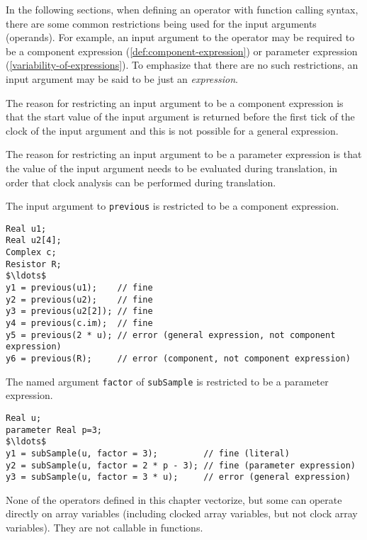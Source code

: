 In the following sections, when defining an operator with function calling syntax, there are some common restrictions being used for the input arguments (operands).
For example, an input argument to the operator may be required to be a component expression (\cref{def:component-expression}) or parameter expression (\cref{variability-of-expressions}).
To emphasize that there are no such restrictions, an input argument may be said to be just an \emph{expression}.

\begin{nonnormative}
The reason for restricting an input argument to be a component expression is that the start value of the input argument is returned before the first tick of the clock of the input argument and this
is not possible for a general expression.

The reason for restricting an input argument to be a parameter expression is that the value of the input argument needs to be evaluated during translation, in order that clock analysis can be performed during translation.
\end{nonnormative}

\begin{example}
The input argument to \lstinline!previous! is restricted to be a component expression.
\begin{lstlisting}[language=modelica]
Real u1;
Real u2[4];
Complex c;
Resistor R;
$\ldots$
y1 = previous(u1);    // fine
y2 = previous(u2);    // fine
y3 = previous(u2[2]); // fine
y4 = previous(c.im);  // fine
y5 = previous(2 * u); // error (general expression, not component expression)
y6 = previous(R);     // error (component, not component expression)
\end{lstlisting}
\end{example}

\begin{example}
The named argument \lstinline!factor! of \lstinline!subSample! is restricted to be a parameter expression.
\begin{lstlisting}[language=modelica]
Real u;
parameter Real p=3;
$\ldots$
y1 = subSample(u, factor = 3);         // fine (literal)
y2 = subSample(u, factor = 2 * p - 3); // fine (parameter expression)
y3 = subSample(u, factor = 3 * u);     // error (general expression)
\end{lstlisting}
\end{example}

None of the operators defined in this chapter vectorize, but some can operate directly on array variables (including clocked array variables, but not clock array variables).
They are not callable in functions.

